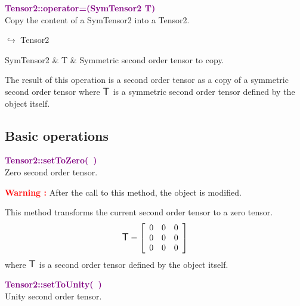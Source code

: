\textcolor{purple}{\textbf{Tensor2::operator=(SymTensor2 T)}}\label{Tensor2::operator=(SymTensor2 T)}\\
Copy the content of a SymTensor2 into a Tensor2.\vspace*{-0.5em}
\begin{tcolorbox}[grow to left by=-1cm, width=\textwidth-1cm,myArgs,tabularx={l|R}]
$\hookrightarrow$ Tensor2
\end{tcolorbox}

\begin{tcolorbox}[width=\textwidth,myArgs,tabularx={ll|R}]
SymTensor2 & T & Symmetric second order tensor to copy.
\end{tcolorbox}

The result of this operation is a second order tensor as a copy of a symmetric second order tensor where $\mbox{\large\ensuremath{\mathsf{T}}}$ is a symmetric second order tensor defined by the object itself.

\subsection{Basic operations}

\textcolor{purple}{\textbf{Tensor2::setToZero(~)}}\label{Tensor2::setToZero()}\\
Zero second order tensor.

\hspace*{10mm}\textcolor{red}{\textbf{Warning :}} After the call to this method, the object is modified.

This method transforms the current second order tensor to a zero tensor.
\begin{equation*}
\mbox{\large\ensuremath{\mathsf{T}}}=\left[\begin{array}{ccc}
0 & 0 & 0\\
0 & 0 & 0\\
0 & 0 & 0
\end{array}\right]
\end{equation*}
where $\mbox{\large\ensuremath{\mathsf{T}}}$ is a second order tensor defined by the object itself.

\textcolor{purple}{\textbf{Tensor2::setToUnity(~)}}\label{Tensor2::setToUnity()}\\
Unity second order tensor.

